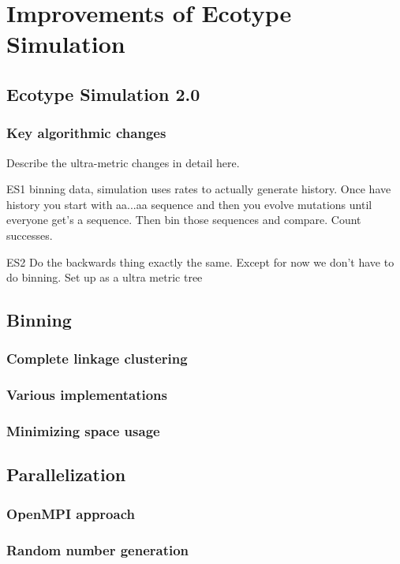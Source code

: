 \chapter{Improvements of Ecotype Simulation}
\section{Ecotype Simulation 2.0}
\subsection{Key algorithmic changes}
Describe the ultra-metric changes in detail here.

ES1 binning data, simulation uses rates to actually generate history. Once have history you start with aa...aa sequence and then you evolve mutations until everyone get's a sequence. Then bin those sequences and compare. Count successes.


ES2 Do the backwards thing exactly the same. Except for now we don't have to do binning. Set up as a ultra metric tree


\section{Binning}
\subsection{Complete linkage clustering}
\subsection{Various implementations}
\subsection{Minimizing space usage}
\section{Parallelization}
\subsection{OpenMPI approach}
\subsection{Random number generation}